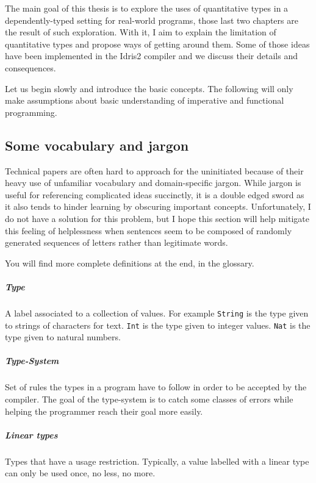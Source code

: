 \documentclass[
]{article}
\begin{document}
The main goal of this thesis is to explore the uses of quantitative
types in a dependently-typed setting for real-world programs, those last
two chapters are the result of such exploration. With it, I aim to
explain the limitation of quantitative types and propose ways of getting
around them. Some of those ideas have been implemented in the Idris2
compiler and we discuss their details and consequences.

Let us begin slowly and introduce the basic concepts. The following will
only make assumptions about basic understanding of imperative and
functional programming.

\hypertarget{some-vocabulary-and-jargon}{%
\subsection{Some vocabulary and
jargon}\label{some-vocabulary-and-jargon}}

Technical papers are often hard to approach for the uninitiated because
of their heavy use of unfamiliar vocabulary and domain-specific jargon.
While jargon is useful for referencing complicated ideas succinctly, it
is a double edged sword as it also tends to hinder learning by obscuring
important concepts. Unfortunately, I do not have a solution for this
problem, but I hope this section will help mitigate this feeling of
helplessness when sentences seem to be composed of randomly generated
sequences of letters rather than legitimate words.

You will find more complete definitions at the end, in the glossary.

\hypertarget{type}{%
\subparagraph{Type}\label{type}}

A label associated to a collection of values. For example
\texttt{String} is the type given to strings of characters for text.
\texttt{Int} is the type given to integer values. \texttt{Nat} is the
type given to natural numbers.

\hypertarget{type-system}{%
\subparagraph{Type-System}\label{type-system}}

Set of rules the types in a program have to follow in order to be
accepted by the compiler. The goal of the type-system is to catch some
classes of errors while helping the programmer reach their goal more
easily.

\hypertarget{linear-types}{%
\subparagraph{Linear types}\label{linear-types}}

Types that have a usage restriction. Typically, a value labelled with a
linear type can only be used once, no less, no more.
\end{document}
